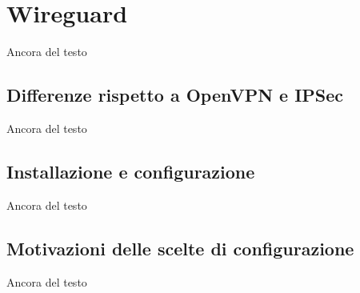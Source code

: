 \section{Wireguard}
Ancora del testo

\subsection{Differenze rispetto a OpenVPN e IPSec}
Ancora del testo

\subsection{Installazione e configurazione}
Ancora del testo

\subsection{Motivazioni delle scelte di configurazione}
Ancora del testo

